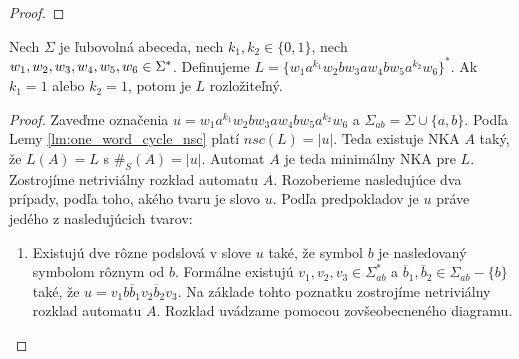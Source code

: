 \begin{proof}
\end{proof}

\begin{proposition}
Nech $ \Sigma $ je ľubovolná abeceda, nech $ k_1,k_2 \in \lbrace 0,1 \rbrace $, nech $ w_1,w_2,w_3,w_4,w_5, \\ w_6 \in \Sigma^* $. Definujeme $ L = \lbrace w_1a^{k_1}w_2bw_3aw_4bw_5a^{k_2}w_6 \rbrace^* $. Ak $ k_1 = 1 $ alebo $ k_2 = 1 $, potom je $ L $ rozložiteľný.
\end{proposition}

\begin{proof}
Zaveďme označenia $ u = w_1a^{k_1}w_2bw_3aw_4bw_5a^{k_2}w_6$ a $ \Sigma_{ab} = \Sigma \cup \lbrace a,b \rbrace $. Podľa Lemy \ref{lm:one_word_cycle_nsc} platí $ nsc(L) = |u| $. Teda existuje NKA $ A $ taký, že $ L(A) = L $ s $ \#_S(A) = |u| $. Automat $ A $ je teda minimálny NKA pre $ L $. Zostrojíme netriviálny rozklad automatu $ A $. Rozoberieme nasledujúce dva prípady, podľa toho, akého tvaru je slovo $ u $. Podľa predpokladov je $ u $ práve jedého z nasledujúcich tvarov:

\begin{enumerate}
\item Existujú dve rôzne podslová v slove $ u $ také, že symbol $ b $ je nasledovaný symbolom rôznym od $ b $. Formálne existujú $ v_1,v_2,v_3 \in \Sigma_{ab}^* $ a $ \overline{b}_1,\overline{b}_2 \in \Sigma_{ab} - \lbrace b \rbrace $ také, že $ u = v_1b\overline{b}_1v_2\overline{b}_2v_3 $. Na základe tohto poznatku zostrojíme netriviálny rozklad automatu $ A $. Rozklad uvádzame pomocou zovšeobecneného diagramu.

\begin{figure}[H]
\centering
{}


\end{figure}
\end{enumerate}
\end{proof}
